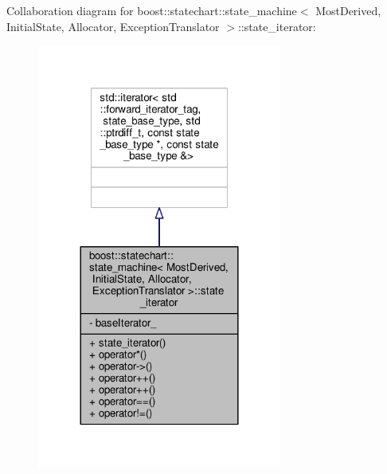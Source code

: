 Collaboration diagram for boost\+:\+:statechart\+:\+:state\+\_\+machine$<$ Most\+Derived, Initial\+State, Allocator, Exception\+Translator $>$\+:\+:state\+\_\+iterator\+:
\nopagebreak
\begin{figure}[H]
\begin{center}
\leavevmode
\includegraphics[width=228pt]{classboost_1_1statechart_1_1state__machine_1_1state__iterator__coll__graph}
\end{center}
\end{figure}
